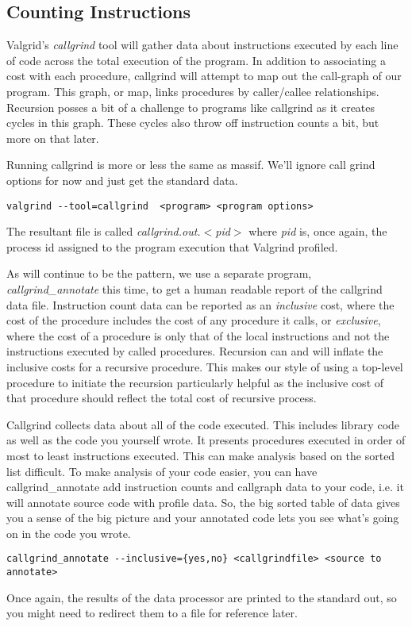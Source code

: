 \documentclass[]{tufte-handout}
\begin{document}
\subsection{Counting Instructions}

Valgrid's \textit{callgrind} tool will gather data about instructions executed by each line of code across the total execution of the program. In addition to associating a cost with each procedure, callgrind will attempt to map out the call-graph of our program. This graph, or map, links procedures by caller/callee relationships. Recursion posses a bit of a challenge to programs like callgrind as it creates cycles in this graph.  These cycles also throw off instruction counts a bit, but more on that later.   

Running callgrind is more or less the same as massif. We'll ignore call grind options for now and just get the standard data.
\begin{verbatim}
valgrind --tool=callgrind  <program> <program options>
\end{verbatim} 
The resultant file is called \textit{callgrind.out.$<$pid$>$} where \textit{pid} is, once again, the process id assigned to the program execution that Valgrind profiled. 

As will continue to be the pattern, we use a separate program, \textit{callgrind\_annotate} this time, to get a human readable report of the callgrind data file. Instruction count data can be reported as an \textit{inclusive} cost, where the cost of the procedure includes the cost of any procedure it calls, or \textit{exclusive}, where the cost of a procedure is only that of the local instructions and not the instructions executed by called procedures.  Recursion can and will inflate the inclusive costs for a recursive procedure.  This makes our style of using a top-level procedure to initiate the recursion particularly helpful as the inclusive cost of that procedure should reflect the total cost of recursive process.    

Callgrind collects data about all of the code executed. This includes library code as well as the code you yourself wrote. It presents procedures executed in order of most to least instructions executed. This can make analysis based on the sorted list difficult. To make analysis of your code easier, you can have callgrind\_annotate add instruction counts and callgraph data to your code, i.e. it will annotate source code with profile data. So, the big sorted table of data gives you a sense of the big picture and your annotated code lets you see what's going on in the code you wrote.
\begin{verbatim}
callgrind_annotate --inclusive={yes,no} <callgrindfile> <source to annotate>
\end{verbatim}
Once again, the results of the data processor are printed to the standard out, so you might need to redirect them to a file for reference later.
\end{document}
